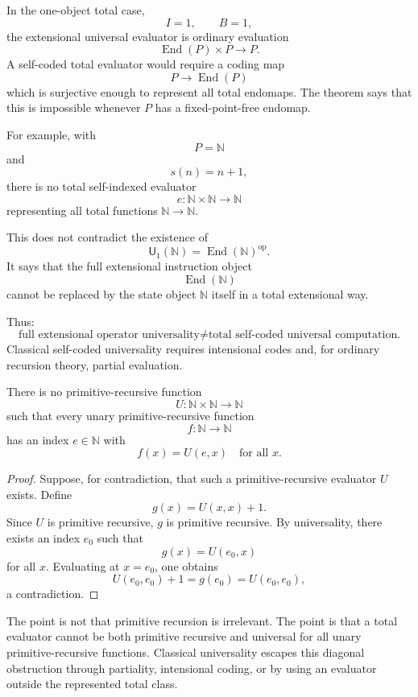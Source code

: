 In the one-object total case,
\[
        I=1,
        \qquad
        B=1,
\]
the extensional universal evaluator is ordinary evaluation
\[
        \operatorname{End}(P)\times P\longrightarrow P.
\]
A self-coded total evaluator would require a coding map
\[
        P\longrightarrow \operatorname{End}(P)
\]
which is surjective enough to represent all total endomaps.  The theorem says that this is
impossible whenever \(P\) has a fixed-point-free endomap.

For example, with
\[
        P=\mathbb N
\]
and
\[
        s(n)=n+1,
\]
there is no total self-indexed evaluator
\[
        e:\mathbb N\times\mathbb N\to\mathbb N
\]
representing all total functions \(\mathbb N\to\mathbb N\).

This does not contradict the existence of
\[
        \mathsf U_1(\mathbb N)=\operatorname{End}(\mathbb N)^{\operatorname{op}}.
\]
It says that the full extensional instruction object
\[
        \operatorname{End}(\mathbb N)
\]
cannot be replaced by the state object \(\mathbb N\) itself in a total extensional way.

Thus:
\[
\boxed{
\text{full extensional operator universality}
\neq
\text{total self-coded universal computation.}
}
\]
Classical self-coded universality requires intensional codes and, for ordinary recursion theory,
partial evaluation.

\begin{corollary}
\label{cor:no-total-pr-self-universal}
There is no primitive-recursive function
\[
        U:\mathbb N\times\mathbb N\to\mathbb N
\]
such that every unary primitive-recursive function
\[
        f:\mathbb N\to\mathbb N
\]
has an index \(e\in\mathbb N\) with
\[
        f(x)=U(e,x)
        \quad\text{for all }x.
\]
\end{corollary}

\begin{proof}
Suppose, for contradiction, that such a primitive-recursive evaluator \(U\) exists.  Define
\[
        g(x)=U(x,x)+1.
\]
Since \(U\) is primitive recursive, \(g\) is primitive recursive.  By universality, there exists an
index \(e_0\) such that
\[
        g(x)=U(e_0,x)
\]
for all \(x\).  Evaluating at \(x=e_0\), one obtains
\[
        U(e_0,e_0)+1
        =
        g(e_0)
        =
        U(e_0,e_0),
\]
a contradiction.
\end{proof}

The point is not that primitive recursion is irrelevant.  The point is that a total evaluator
cannot be both primitive recursive and universal for all unary primitive-recursive functions.
Classical universality escapes this diagonal obstruction through partiality, intensional coding, or
by using an evaluator outside the represented total class.

